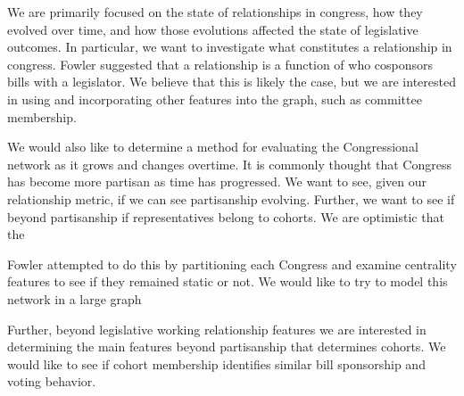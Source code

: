 We are primarily focused on the state of relationships in congress, how 
they evolved over time, and how those evolutions affected the state of 
legislative outcomes. In particular, we want to investigate what constitutes a 
relationship in congress. Fowler suggested that a relationship is a function 
of who cosponsors bills with a legislator. We believe that this is likely the 
case, but we are interested in using and incorporating other features into 
the graph, such as committee membership. 

We would also like to determine a method for evaluating the Congressional
network as it grows and changes overtime. It is commonly thought that Congress
has become more partisan as time has progressed. We want to see, given our
relationship metric, if we can see partisanship evolving. Further, we want to
see if beyond partisanship if representatives belong to cohorts. We are 
optimistic that the

Fowler attempted to do this by  partitioning each Congress and examine
centrality features to see if they  remained static or not. We would like to try
to model this network in a  large graph


Further, beyond legislative working relationship features we are interested in 
determining the main features beyond partisanship that determines cohorts. We 
would like to see if cohort membership identifies similar bill sponsorship and 
voting behavior.
